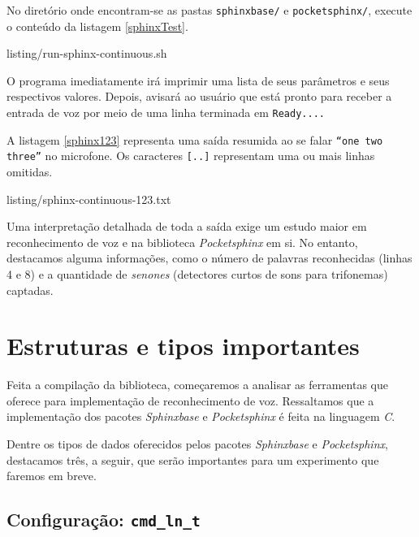 No diretório onde encontram-se as pastas \texttt{sphinxbase/} e \texttt{pocketsphinx/}, execute o conteúdo da listagem \ref{sphinxTest}.


  {listing/run-sphinx-continuous.sh}

O programa imediatamente irá imprimir uma lista de seus parâmetros e seus respectivos valores. Depois, avisará ao usuário que está pronto para receber a entrada de voz por meio de uma linha terminada em \texttt{Ready....}

A listagem \ref{sphinx123} representa uma saída resumida ao se falar \texttt{``one two three''} no microfone. Os caracteres \texttt{[..]} representam uma ou mais linhas omitidas.


  {listing/sphinx-continuous-123.txt}

Uma interpretação detalhada de toda a saída exige um estudo maior em reconhecimento de voz e na biblioteca \textit{Pocketsphinx} em si. No entanto, destacamos alguma informações, como o número de palavras reconhecidas (linhas 4 e 8) e a quantidade de \textit{senones} (detectores curtos de sons para trifonemas) captadas.


\section{Estruturas e tipos importantes}
\label{pocketsphinx-structs}

Feita a compilação da biblioteca, começaremos a analisar as ferramentas que oferece para implementação de reconhecimento de voz. Ressaltamos que a implementação dos pacotes \textit{Sphinxbase} e \textit{Pocketsphinx} é feita na linguagem \textit{C}.

Dentre os tipos de dados oferecidos pelos pacotes \textit{Sphinxbase} e \textit{Pocketsphinx}, destacamos três, a seguir, que serão importantes para um experimento que faremos em breve.


\subsection{Configuração: \texttt{cmd\_ln\_t}}

